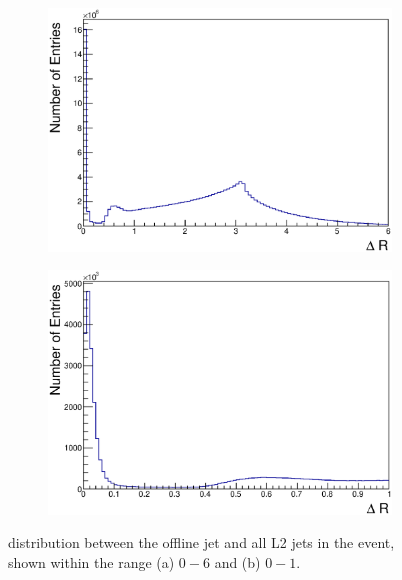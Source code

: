 \begin{figure}
\centering
        \begin{subfigure}[b]{0.5\textwidth}
                \centering
                \includegraphics[width=\textwidth]{figures/ServiceWork/Jets/L2_DRUnmatchedJetsJet.eps}
        \end{subfigure}%
        \begin{subfigure}[b]{0.5\textwidth}
                \centering
                \includegraphics[width=\textwidth]{figures/ServiceWork/Jets/L2_DRUnmatchedJetsZoomedJet.eps}
        \end{subfigure}%
\caption[\dr{} between offline and L2 jets]{
\dr{} distribution between the offline jet and all L2 jets in the event, shown within the range (a) $0 - 6$ and (b) $0 - 1$.
\label{SW_jet_L2_dR}}
\end{figure}

